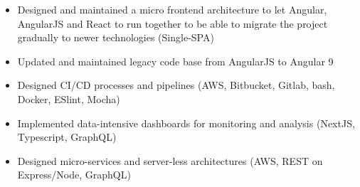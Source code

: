 \documentclass[10pt,a4paper,ragged2e]{altacv}
\newcommand\faSkype{{\FA\symbol{"F17E}}}
\begin{document}

\begin{fullwidth}
\makecvheader
\end{fullwidth}



\begin{itemize}
\item Designed and maintained a micro frontend architecture to let Angular, AngularJS and React to run together to be able to migrate the project gradually to newer technologies (Single-SPA)
\item Updated and maintained legacy code base from AngularJS to Angular 9
\item Designed CI/CD processes and pipelines (AWS, Bitbucket, Gitlab, bash, Docker, ESlint, Mocha)
\item Implemented data-intensive dashboards for monitoring and analysis (NextJS, Typescript, GraphQL)
\item Designed micro-services and server-less architectures (AWS, REST on Express/Node, GraphQL)

\end{itemize}
\end{document}
